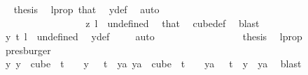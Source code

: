 \begin{isabellebody}
\ \isamarkupfalse%
\ {\isacharquery}{\kern0pt}thesis\ \isamarkupfalse%
\ l{\isacharunderscore}{\kern0pt}prop\ that{\isacharparenleft}{\kern0pt}{}{\isacharparenright}{\kern0pt}\ \isamarkupfalse%
\ y{\isacharunderscore}{\kern0pt}def\ \isamarkupfalse%
\ auto\isanewline
\ \ \ \ \ \ \ \ \ \ \ \ \isamarkupfalse%
\isanewline
\ \ \ \ \ \ \ \ \ \ \ \ \ \ \isamarkupfalse%
\ {}\isanewline
\ \ \ \ \ \ \ \ \ \ \ \ \ \ \isamarkupfalse%
\ \isamarkupfalse%
\ {\isachardoublequoteopen}z\ l\ {\isacharequal}{\kern0pt}\ undefined{\isachardoublequoteclose}\ \isamarkupfalse%
\ that\ \isamarkupfalse%
\ cube{\isacharunderscore}{\kern0pt}def\ \isamarkupfalse%
\ blast\isanewline
\ \ \ \ \ \ \ \ \ \ \ \ \ \ \isamarkupfalse%
\ \isamarkupfalse%
\ {\isachardoublequoteopen}y\ t\ l\ {\isacharequal}{\kern0pt}\ undefined{\isachardoublequoteclose}\ \isamarkupfalse%
\ y{\isacharunderscore}{\kern0pt}def\ \isamarkupfalse%
\ {}\ \isamarkupfalse%
\ auto\isanewline
\ \ \ \ \ \ \ \ \ \ \ \ \ \ \isamarkupfalse%
\ \isamarkupfalse%
\ {\isacharquery}{\kern0pt}thesis\ \isamarkupfalse%
\ l{\isacharunderscore}{\kern0pt}prop\ \isamarkupfalse%
\ presburger\isanewline
\ \ \ \ \ \ \ \ \ \ \ \ \isamarkupfalse%
\isanewline
\ \ \ \ \ \ \ \ \ \ \isamarkupfalse%
\isanewline
\ \ \ \ \ \ \ \ \ \ \isamarkupfalse%
\ \isamarkupfalse%
\ {\isachardoublequoteopen}{\isasymexists}y{\isachardot}{\kern0pt}\ {\isacharparenleft}{\kern0pt}y\ {\isasymin}\ cube\ {}\ {\isacharparenleft}{\kern0pt}t\ {\isacharplus}{\kern0pt}\ {}{\isacharparenright}{\kern0pt}\ {\isasymand}\ y\ {}\ {\isacharequal}{\kern0pt}\ t{\isacharparenright}{\kern0pt}\ {\isasymand}\ {\isacharparenleft}{\kern0pt}{\isasymforall}ya{\isachardot}{\kern0pt}\ ya\ {\isasymin}\ cube\ {}\ {\isacharparenleft}{\kern0pt}t\ {\isacharplus}{\kern0pt}\ {}{\isacharparenright}{\kern0pt}\ {\isasymand}\ ya\ {}\ {\isacharequal}{\kern0pt}\ t\ {\isasymlongrightarrow}\ y\ {\isacharequal}{\kern0pt}\ ya{\isacharparenright}{\kern0pt}{\isachardoublequoteclose}\ \isamarkupfalse%
\ blast\isanewline
\ \ \ \ \ \ \ \ \isamarkupfalse%

\end{isabellebody}
